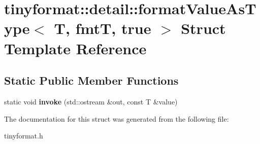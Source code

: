 \hypertarget{structtinyformat_1_1detail_1_1formatValueAsType_3_01T_00_01fmtT_00_01true_01_4}{}\section{tinyformat\+:\+:detail\+:\+:format\+Value\+As\+Type$<$ T, fmtT, true $>$ Struct Template Reference}
\label{structtinyformat_1_1detail_1_1formatValueAsType_3_01T_00_01fmtT_00_01true_01_4}
\subsection*{Static Public Member Functions}
\begin{DoxyCompactItemize}
\item 
\mbox{\label{structtinyformat_1_1detail_1_1formatValueAsType_3_01T_00_01fmtT_00_01true_01_4_a7680bc0f7b6b5eee0e27c494812fb667}} 
static void {\bfseries invoke} (std\+::ostream \&out, const T \&value)
\end{DoxyCompactItemize}


The documentation for this struct was generated from the following file\+:\begin{DoxyCompactItemize}
\item 
tinyformat.\+h\end{DoxyCompactItemize}
